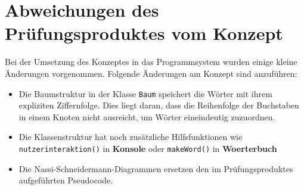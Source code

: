 %

\chapter{Abweichungen des Prüfungsproduktes vom Konzept}

Bei der Umsetzung des Konzeptes in das Programmsystem wurden einige kleine Änderungen vorgenommen. Folgende Änderungen am Konzept sind anzuführen:

\begin{itemize}
    \item Die Baumstruktur in der Klasse \texttt{Baum} speichert die Wörter mit ihrem expliziten Ziffernfolge. Dies liegt daran, dass die Reihenfolge der Buchstaben in einem Knoten nicht ausreicht, um Wörter eineindeutig zuzuordnen.
    \item Die Klassenstruktur hat noch zusätzliche Hilfsfunktionen wie \texttt{nutzerinteraktion()} in \textbf{Konsole} oder \texttt{makeWord()} in \textbf{Woerterbuch}
    \item Die Nassi-Schneidermann-Diagrammen ersetzen den im Prüfungsproduktes aufgeführten Pseudocode.
\end{itemize}